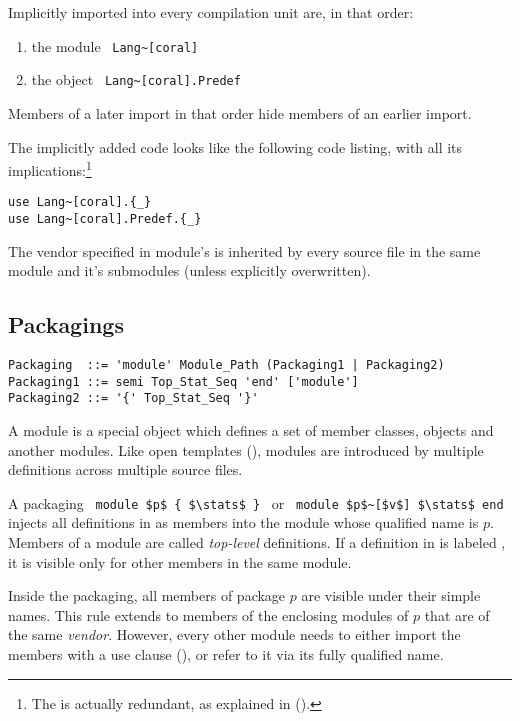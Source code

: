 Implicitly imported into every compilation unit are, in that order: 
\begin{enumerate}
\item the module ~\lstinline!Lang~[coral]! 
\item the object ~\lstinline!Lang~[coral].Predef!
\end{enumerate} 
Members of a later import in that order hide members of an earlier import. 


The implicitly added code looks like the following code listing, with all its implications:\footnote{The  is actually redundant, as explained in ().}
\begin{lstlisting}
use Lang~[coral].{_}
use Lang~[coral].Predef.{_}
\end{lstlisting}

The vendor specified in module's  is inherited by every source file in the same module and it's submodules (unless explicitly overwritten). 





\subsection{Packagings}

\syntax\begin{lstlisting}
Packaging  ::= 'module' Module_Path (Packaging1 | Packaging2)
Packaging1 ::= semi Top_Stat_Seq 'end' ['module']
Packaging2 ::= '{' Top_Stat_Seq '}'
\end{lstlisting}

A module is a special object which defines a set of member classes, objects and another modules. Like open templates (), modules are introduced by multiple definitions across multiple source files.  

A packaging ~\lstinline!module $p$ { $\stats$ }!~ or ~\lstinline!module $p$~[$v$] $\stats$ end!~ injects all definitions in \stats as members into the module whose qualified name is $p$. Members of a module are called {\em top-level} definitions. If a definition in \stats is labeled , it is visible only for other members in the same module. 

Inside the packaging, all members of package $p$ are visible under their simple names. This rule extends to members of the enclosing modules of $p$ that are of the same {\em vendor}. However, every other module needs to either import the members with a use clause (), or refer to it via its fully qualified name. 

